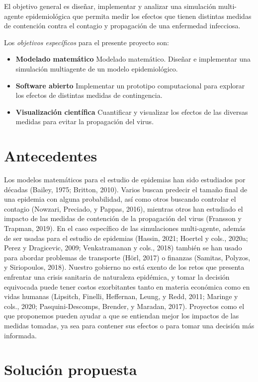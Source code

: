 \documentclass{sciposter}
\begin{document}
\begin{multicols}{2}
El objetivo general es diseñar, implementar y analizar una simulación multi-agente epidemiológica que permita medir los efectos que tienen distintas medidas de contención contra el contagio y propagación de una enfermedad infecciosa.\par
Los \emph{objetivos específicos} para el presente proyecto son:\par
\begin{itemize}
  \item \textbf{Modelado matemático} Modelado matemático. Diseñar e implementar una simulación multiagente de un modelo epidemiológico.
  \item \textbf{Software abierto} Implementar un prototipo computacional para explorar los efectos de distintas medidas de contingencia.
  \item \textbf{Visualización científica} Cuantificar y visualizar los efectos de las diversas medidas para evitar la propagación del virus.
\end{itemize}

\section{Antecedentes}
Los modelos matemáticos para el estudio de epidemias han sido estudiados por décadas (Bailey, 1975; Britton, 2010). Varios buscan predecir el tamaño final de una epidemia con alguna probabilidad, así como otros buscando controlar el contagio (Nowzari, Preciado, y Pappas, 2016), mientras otros han estudiado el impacto de las medidas de contención de la propagación del virus (Fransson y Trapman, 2019). En el caso específico de las simulaciones multi-agente, además de ser usadas para el estudio de epidemias (Hassin, 2021; Hoertel y cols., 2020a; Perez y Dragicevic, 2009; Venkatramanan y cols., 2018) también se han usado para abordar problemas de transporte (Hörl, 2017) o finanzas (Samitas, Polyzos, y Siriopoulos, 2018). Nuestro gobierno no está exento de los retos que presenta enfrentar una crisis sanitaria de naturaleza epidémica, y tomar la decisión equivocada puede tener costos exorbitantes tanto en materia económica como en vidas humanas (Lipsitch, Finelli, Heffernan, Leung, y Redd, 2011; Maringe y cols., 2020; Pasquini-Descomps, Brender, y Maradan, 2017). Proyectos como el que proponemos pueden ayudar a que se entiendan mejor los impactos de las medidas tomadas, ya sea para contener sus efectos o para tomar una decisión más informada.

\section{Solución propuesta}


\end{multicols}
\end{document}
